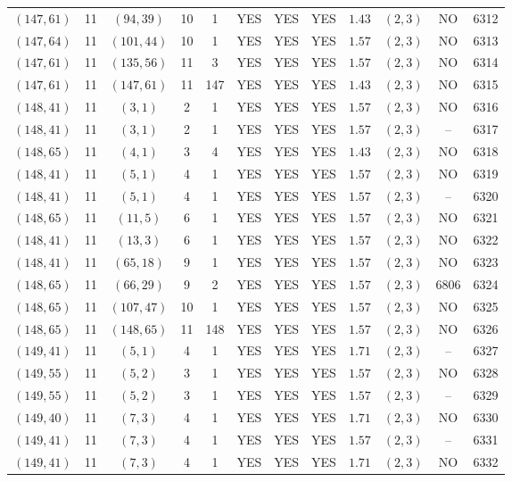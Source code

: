 \begin{longtable}{|c|c|c|c|c|c|c|c|c|c|c|c|}
$(147,61)$ & 11 & $(94,39)$ & 10 & 1 & YES & YES & YES & $1.43$ & $(2,3)$ & NO & 6312\\
$(147,64)$ & 11 & $(101,44)$ & 10 & 1 & YES & YES & YES & $1.57$ & $(2,3)$ & NO & 6313\\
$(147,61)$ & 11 & $(135,56)$ & 11 & 3 & YES & YES & YES & $1.57$ & $(2,3)$ & NO & 6314\\
$(147,61)$ & 11 & $(147,61)$ & 11 & 147 & YES & YES & YES & $1.43$ & $(2,3)$ & NO & 6315\\
$(148,41)$ & 11 & $(3,1)$ & 2 & 1 & YES & YES & YES & $1.57$ & $(2,3)$ & NO & 6316\\
$(148,41)$ & 11 & $(3,1)$ & 2 & 1 & YES & YES & YES & $1.57$ & $(2,3)$ & -- & 6317\\
$(148,65)$ & 11 & $(4,1)$ & 3 & 4 & YES & YES & YES & $1.43$ & $(2,3)$ & NO & 6318\\
$(148,41)$ & 11 & $(5,1)$ & 4 & 1 & YES & YES & YES & $1.57$ & $(2,3)$ & NO & 6319\\
$(148,41)$ & 11 & $(5,1)$ & 4 & 1 & YES & YES & YES & $1.57$ & $(2,3)$ & -- & 6320\\
$(148,65)$ & 11 & $(11,5)$ & 6 & 1 & YES & YES & YES & $1.57$ & $(2,3)$ & NO & 6321\\
$(148,41)$ & 11 & $(13,3)$ & 6 & 1 & YES & YES & YES & $1.57$ & $(2,3)$ & NO & 6322\\
$(148,41)$ & 11 & $(65,18)$ & 9 & 1 & YES & YES & YES & $1.57$ & $(2,3)$ & NO & 6323\\
$(148,65)$ & 11 & $(66,29)$ & 9 & 2 & YES & YES & YES & $1.57$ & $(2,3)$ & 6806 & 6324\\
$(148,65)$ & 11 & $(107,47)$ & 10 & 1 & YES & YES & YES & $1.57$ & $(2,3)$ & NO & 6325\\
$(148,65)$ & 11 & $(148,65)$ & 11 & 148 & YES & YES & YES & $1.57$ & $(2,3)$ & NO & 6326\\
$(149,41)$ & 11 & $(5,1)$ & 4 & 1 & YES & YES & YES & $1.71$ & $(2,3)$ & -- & 6327\\
$(149,55)$ & 11 & $(5,2)$ & 3 & 1 & YES & YES & YES & $1.57$ & $(2,3)$ & NO & 6328\\
$(149,55)$ & 11 & $(5,2)$ & 3 & 1 & YES & YES & YES & $1.57$ & $(2,3)$ & -- & 6329\\
$(149,40)$ & 11 & $(7,3)$ & 4 & 1 & YES & YES & YES & $1.71$ & $(2,3)$ & NO & 6330\\
$(149,41)$ & 11 & $(7,3)$ & 4 & 1 & YES & YES & YES & $1.57$ & $(2,3)$ & -- & 6331\\
$(149,41)$ & 11 & $(7,3)$ & 4 & 1 & YES & YES & YES & $1.71$ & $(2,3)$ & NO & 6332\\

\end{longtable}
